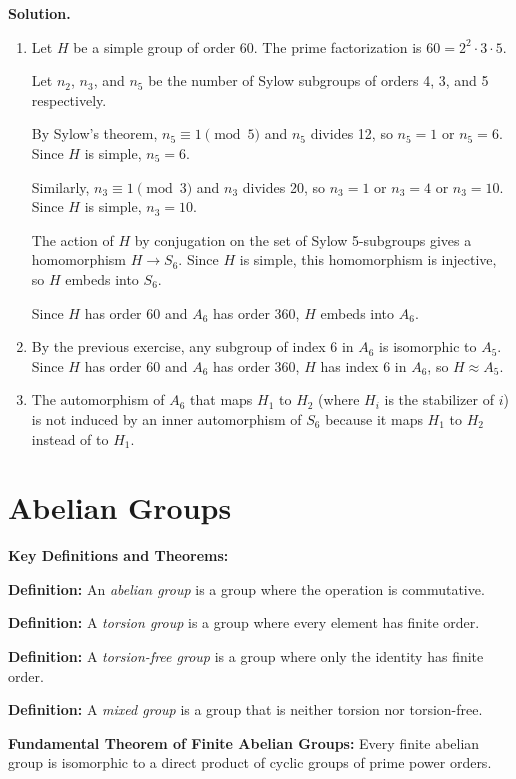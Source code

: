 \noindent\textbf{Solution.}
\begin{enumerate}[label=(\alph*)]
\item Let $H$ be a simple group of order 60. The prime factorization is $60 = 2^2 \cdot 3 \cdot 5$.

Let $n_2$, $n_3$, and $n_5$ be the number of Sylow subgroups of orders 4, 3, and 5 respectively.

By Sylow's theorem, $n_5 \equiv 1 \pmod{5}$ and $n_5$ divides 12, so $n_5 = 1$ or $n_5 = 6$. Since $H$ is simple, $n_5 = 6$.

Similarly, $n_3 \equiv 1 \pmod{3}$ and $n_3$ divides 20, so $n_3 = 1$ or $n_3 = 4$ or $n_3 = 10$. Since $H$ is simple, $n_3 = 10$.

The action of $H$ by conjugation on the set of Sylow 5-subgroups gives a homomorphism $H \to S_6$. Since $H$ is simple, this homomorphism is injective, so $H$ embeds into $S_6$.

Since $H$ has order 60 and $A_6$ has order 360, $H$ embeds into $A_6$.

\item By the previous exercise, any subgroup of index 6 in $A_6$ is isomorphic to $A_5$. Since $H$ has order 60 and $A_6$ has order 360, $H$ has index 6 in $A_6$, so $H \approx A_5$.

\item The automorphism of $A_6$ that maps $H_1$ to $H_2$ (where $H_i$ is the stabilizer of $i$) is not induced by an inner automorphism of $S_6$ because it maps $H_1$ to $H_2$ instead of to $H_1$.
\end{enumerate}

\section{Abelian Groups}

\textbf{Key Definitions and Theorems:}

\textbf{Definition:} An \textit{abelian group} is a group where the operation is commutative.

\textbf{Definition:} A \textit{torsion group} is a group where every element has finite order.

\textbf{Definition:} A \textit{torsion-free group} is a group where only the identity has finite order.

\textbf{Definition:} A \textit{mixed group} is a group that is neither torsion nor torsion-free.

\textbf{Fundamental Theorem of Finite Abelian Groups:} Every finite abelian group is isomorphic to a direct product of cyclic groups of prime power orders.

